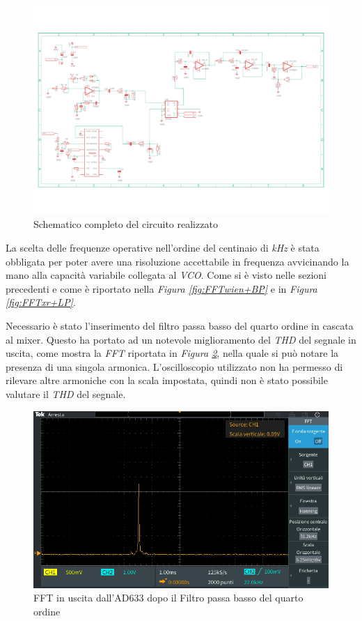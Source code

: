 \documentclass[titlepage]{report}
\begin{document}
	\begin{figure}[H]
		\centering
		\includegraphics[scale=0.4]{Immagini/Schematico Completo.pdf}
		\caption{Schematico completo del circuito realizzato}
		\label{fig:Schematico Completo}
	\end{figure}

	\noindent La scelta delle frequenze operative nell'ordine del centinaio di \textit{kHz} è stata obbligata per poter avere una risoluzione accettabile in frequenza avvicinando la mano alla capacità variabile collegata al \textit{VCO}.
	Come si è visto nelle sezioni precedenti e come è riportato nella \textit{Figura \ref{fig:FFTwien+BP}} e in \textit{Figura \ref{fig:FFTxr+LP}}.

	\noindent Necessario è stato l'inserimento del filtro passa basso del quarto ordine in cascata al mixer. Questo ha portato ad un notevole miglioramento del \textit{THD} del segnale in uscita, come mostra la \textit{FFT} riportata in \textit{Figura \ref{fig:FFTAD33+LP4}}, nella quale si può notare la presenza di una singola armonica. L'oscilloscopio utilizzato non ha permesso di rilevare altre armoniche con la scala impostata, quindi non è stato possibile valutare il \textit{THD} del segnale.
	
	\begin{figure}[H]
		\centering
		\includegraphics[scale = 0.5]{Immagini/fft_ad633+lp4.PNG}
		\caption{FFT in uscita dall'AD633 dopo il Filtro passa basso del quarto ordine}
		\label{fig:FFTAD33+LP4}
	\end{figure}
\end{document}
